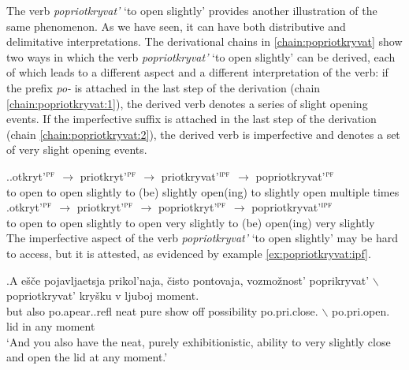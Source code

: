 The verb \textit{popriotkryvat'} `to open slightly' provides another illustration of the same phenomenon. As we have seen, it can have both distributive  and delimitative  interpretations. The derivational chains in \ref{chain:popriotkryvat} show two ways in which the verb \textit{popriotkryvat'} `to open slightly' can be derived, each of which leads to a different aspect and a different interpretation of the verb: if the prefix \textit{po-}   is attached in the last step of the derivation (chain \ref{chain:popriotkryvat:1}), the derived verb denotes a series of  slight opening events. If the imperfective suffix   is attached in the last step of the derivation (chain \ref{chain:popriotkryvat:2}), the derived verb is imperfective and denotes a set of very slight opening events. 

\ex.\label{chain:popriotkryvat}\ag.\label{chain:popriotkryvat:1}otkryt'$^{\textsc{pf}}$ $\rightarrow$ priotkryt'$^{\textsc{pf}}$ $\rightarrow$ priotkryvat'$^{\textsc{ipf}}$ $\rightarrow$ popriotkryvat'$^{\textsc{pf}}$\\
{to open} {} {to open slightly} {} {to (be) slightly open(ing)} {} {to slightly open multiple times}\\
\bg.\label{chain:popriotkryvat:2}otkryt'$^{\textsc{pf}}$ $\rightarrow$ priotkryt'$^{\textsc{pf}}$ $\rightarrow$ popriotkryt'$^{\textsc{pf}}$ $\rightarrow$ popriotkryvat'$^{\textsc{ipf}}$\\
{to open} {} {to open slightly} {} {to open very slightly} {} {to (be) open(ing) very slightly}\\

The imperfective aspect of the verb \textit{popriotkryvat'} `to open slightly' may be hard to access, but it is attested, as evidenced by example \ref{ex:popriotkryvat:ipf}. 

\exg.\label{ex:popriotkryvat:ipf}A e\v{s}\v{c}e pojavljaetsja prikol'naja, \v{c}isto pontovaja, vozmo\v{z}nost' poprikryvat' {$\backslash$} popriotkryvat' kry\v{s}ku v ljuboj moment.\\
but also po.apear..refl neat pure {show off} possibility po.pri.close. {$\backslash$} po.pri.open. lid in any moment\\
`And you also have the neat, purely exhibitionistic, ability to very slightly close and open the lid at any moment.'


